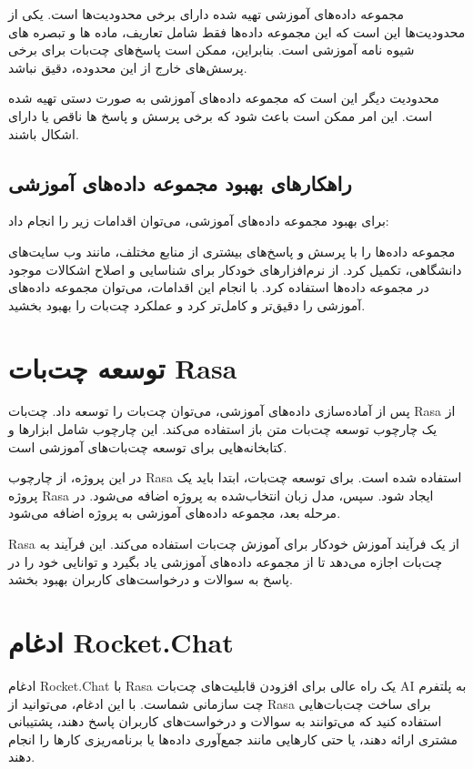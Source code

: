 مجموعه داده‌های آموزشی تهیه شده دارای برخی محدودیت‌ها است. یکی از محدودیت‌ها این است که این مجموعه داده‌ها فقط شامل تعاریف، ماده ها و تبصره های شیوه نامه آموزشی است. بنابراین، ممکن است پاسخ‌های چت‌بات برای برخی پرسش‌های خارج از این محدوده، دقیق نباشد.

محدودیت دیگر این است که مجموعه داده‌های آموزشی به صورت دستی تهیه شده است. این امر ممکن است باعث شود که برخی پرسش و پاسخ ها ناقص یا دارای اشکال باشند.

\subsection{راهکارهای بهبود مجموعه داده‌های آموزشی}

برای بهبود مجموعه داده‌های آموزشی، می‌توان اقدامات زیر را انجام داد:

مجموعه داده‌ها را با پرسش و پاسخ‌های بیشتری از منابع مختلف، مانند وب سایت‌های دانشگاهی، تکمیل کرد.
از نرم‌افزارهای خودکار برای شناسایی و اصلاح اشکالات موجود در مجموعه داده‌ها استفاده کرد.
با انجام این اقدامات، می‌توان مجموعه داده‌های آموزشی را دقیق‌تر و کامل‌تر کرد و عملکرد چت‌بات را بهبود بخشید.


\section{توسعه چت‌بات Rasa}

پس از آماده‌سازی داده‌های آموزشی، می‌توان چت‌بات را توسعه داد. چت‌بات Rasa از یک چارچوب توسعه چت‌بات متن باز استفاده می‌کند. این چارچوب شامل ابزارها و کتابخانه‌هایی برای توسعه چت‌بات‌های آموزشی است.

در این پروژه، از چارچوب Rasa استفاده شده است. برای توسعه چت‌بات، ابتدا باید یک پروژه Rasa ایجاد شود. سپس، مدل زبان انتخاب‌شده به پروژه اضافه می‌شود. در مرحله بعد، مجموعه داده‌های آموزشی به پروژه اضافه می‌شود.

Rasa از یک فرآیند آموزش خودکار برای آموزش چت‌بات استفاده می‌کند. این فرآیند به چت‌بات اجازه می‌دهد تا از مجموعه داده‌های آموزشی یاد بگیرد و توانایی خود را در پاسخ به سوالات و درخواست‌های کاربران بهبود بخشد.

\section{ادغام Rocket.Chat}

ادغام Rocket.Chat با Rasa یک راه عالی برای افزودن قابلیت‌های چت‌بات AI به پلتفرم چت سازمانی شماست. با این ادغام، می‌توانید از Rasa برای ساخت چت‌بات‌هایی استفاده کنید که می‌توانند به سوالات و درخواست‌های کاربران پاسخ دهند، پشتیبانی مشتری ارائه دهند، یا حتی کارهایی مانند جمع‌آوری داده‌ها یا برنامه‌ریزی کارها را انجام دهند.

